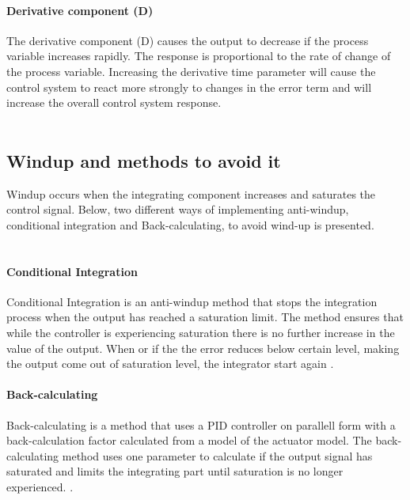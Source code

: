 \paragraph{Derivative component (D)}
The derivative component (D) causes the output to decrease if the process variable increases rapidly. The response is proportional to the rate of change of the process variable. Increasing the derivative time parameter will cause the control system to react more strongly to changes in the error term and will increase the overall control system response. \cite{4}
\\
\\
\subsection{Windup and methods to avoid it}
Windup occurs when the integrating component increases and saturates the control signal. Below, two different ways of implementing anti-windup, conditional integration and Back-calculating, to avoid wind-up is presented.\\
\\
\paragraph{Conditional Integration}
Conditional Integration is an anti-windup method that stops the integration process when the output has reached a saturation limit. The method ensures that while the controller is experiencing saturation there is no further increase in the value of the output. When or if the the error reduces below certain level, making the output come out of saturation level, the integrator start again \cite{5}.
\paragraph{Back-calculating}
Back-calculating is a method that uses a PID controller on parallell form with a back-calculation factor calculated from a model of the actuator model. The back-calculating method uses one parameter to calculate if the output signal has saturated and limits the integrating part until saturation is no longer experienced. \cite{5}. \\
\\
